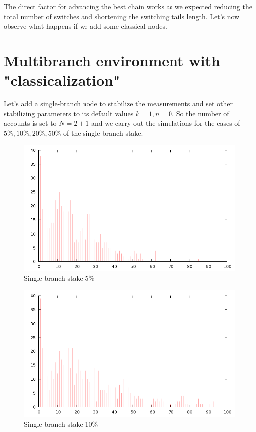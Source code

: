 \documentclass[12pt]{article}
\begin{document}
The direct factor for advancing the best chain works as we expected reducing the total number of switches and shortening the switching tails length.
Let's now observe what happens if we add some classical nodes. 

\section{Multibranch environment with "classicalization"}

Let's add a single-branch node to stabilize the measurements and set other stabilizing parameters to its default values $k=1,n=0$.
So the number of accounts is set to $N=2+1$ and we carry out the simulations for the cases of $5\%,10\%,20\%,50\%$ of the single-branch stake.

\begin{figure}[H]
\centering
\caption{Single-branch stake 5\%}
\includegraphics[scale=0.6]{changes-s5n0k1.png}
\end{figure} 

\begin{figure}[H]
\centering
\caption{Single-branch stake 10\%}
\includegraphics[scale=0.6]{changes-s10n0k1.png}
\end{figure} 
\end{document}
